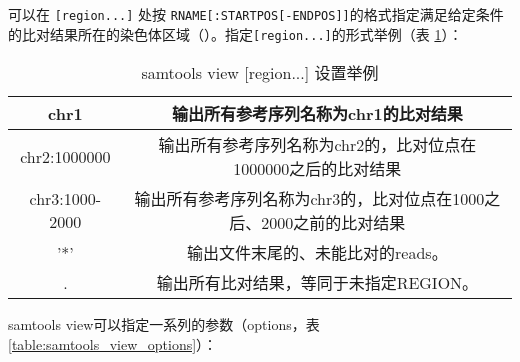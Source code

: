 可以在 \verb|[region...]| 处按 \verb|RNAME[:STARTPOS[-ENDPOS]]|的格式指定满足给定条件的比对结果所在的染色体区域（）。指定\verb|[region...]|的形式举例（表 \ref{table:examples_for_samtools_view_region}）：

\begin{table}
	\label{table:examples_for_samtools_view_region}
	\caption{samtools view [region...] 设置举例}
	\begin{tabular}{|c|c|}
		\hline 
		chr1 & 输出所有参考序列名称为chr1的比对结果 \\ \hline 
		chr2:1000000 & 输出所有参考序列名称为chr2的，比对位点在1000000之后的比对结果 \\ \hline 
		chr3:1000-2000 & 输出所有参考序列名称为chr3的，比对位点在1000之后、2000之前的比对结果 \\ \hline 
		'*' & 输出文件末尾的、未能比对的reads。\\ \hline
		. & 输出所有比对结果，等同于未指定REGION。\\ \hline
	\end{tabular} 
\end{table}


samtools view可以指定一系列的参数（options，表 \ref{table:samtools_view_options}）：

